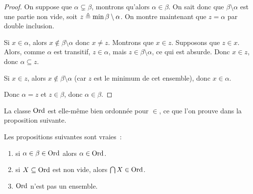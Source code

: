 \begin{proof}
  On suppose que $\alpha \subsetneq \beta$, montrons qu'alors
  $\alpha \in \beta$. On sait donc que $\beta\setminus\alpha$ est une partie
  non vide, soit $z \triangleq \min \beta\setminus\alpha$. On montre maintenant que
  $z = \alpha$ par double inclusion.

  Si $x\in \alpha$, alors $x\notin\beta\setminus\alpha$ donc $x\neq z$. Montrons
  que $x\in z$. Supposons que $z\in x$. Alors, comme $\alpha$ est transitif,
  $z\in \alpha$, mais $z\in\beta\setminus\alpha$, ce qui est absurde. Donc
  $x\in z$, donc $\alpha\subseteq z$.

  Si $x\in z$, alors $x\notin\beta\setminus\alpha$ (car $z$ est le minimum de
  cet ensemble), donc $x\in\alpha$.

  Donc $\alpha = z$ et $z\in \beta$, donc $\alpha \in \beta$.
\end{proof}

La classe $\operatorname{Ord}$ est elle-même bien ordonnée pour $\in$, ce que l'on prouve dans
la proposition suivante.

\begin{proposition}
  Les propositions suivantes sont vraies~:
  \begin{enumerate}
  \item si $\alpha \in \beta \in \operatorname{Ord}$ alors $\alpha \in \operatorname{Ord}$.
  \item si $X\subseteq \operatorname{Ord}$ est non vide, alors $\bigcap X \in \operatorname{Ord}$.
  \item $\operatorname{Ord}$ n'est pas un ensemble.
  \end{enumerate}
\end{proposition}

